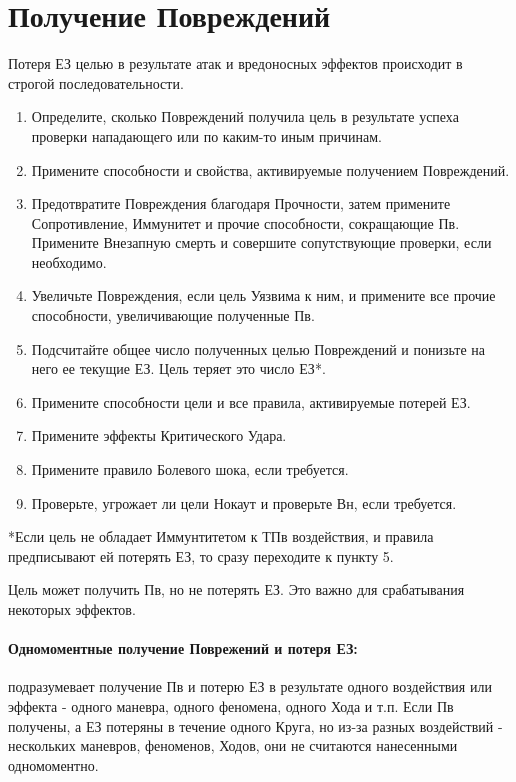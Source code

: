\section{Получение Повреждений}
Потеря ЕЗ целью в результате атак и вредоносных эффектов происходит в строгой последовательности.
\begin{enumerate}
  \item Определите, сколько Повреждений получила цель в результате успеха проверки нападающего или по каким-то иным причинам.
  \item Примените способности и свойства, активируемые получением Повреждений.
  \item Предотвратите Повреждения благодаря Прочности, затем примените Сопротивление, Иммунитет и прочие способности, сокращающие Пв. Примените Внезапную смерть и совершите сопутствующие проверки, если необходимо.
  \item Увеличьте Повреждения, если цель Уязвима к ним, и примените все прочие способности, увеличивающие полученные Пв.
  \item Подсчитайте общее число полученных целью Повреждений и понизьте на него ее текущие ЕЗ. Цель теряет это число ЕЗ*.
  \item Примените способности цели и все правила, активируемые потерей ЕЗ.
  \item Примените эффекты Критического Удара.
  \item Примените правило Болевого шока, если требуется.
  \item Проверьте, угрожает ли цели Нокаут и проверьте Вн, если требуется.
\end{enumerate}
*Если цель не обладает Иммунтитетом к ТПв воздействия, и правила предписывают ей потерять ЕЗ, то сразу переходите к пункту 5. 
\begin{tcolorbox}
  Цель может получить Пв, но не потерять ЕЗ. Это важно для срабатывания некоторых эффектов.
\end{tcolorbox}

\paragraph{Одномоментные получение Поврежений и потеря ЕЗ:} подразумевает получение Пв и потерю ЕЗ в результате одного воздействия или эффекта - одного маневра, одного феномена, одного Хода и т.п. Если Пв получены, а ЕЗ потеряны в течение одного Круга, но из-за разных воздействий - нескольких маневров, феноменов, Ходов, они не считаются нанесенными одномоментно.


